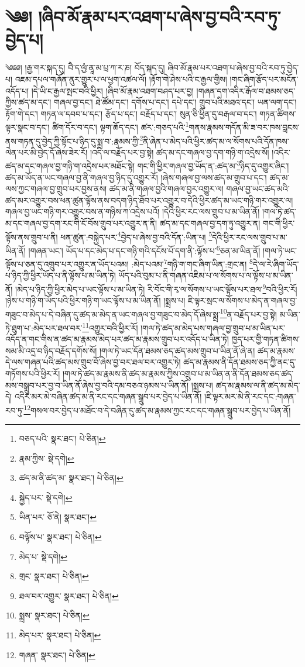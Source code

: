 \setcounter{footnote}{0} 
\chapter{༄༅། །ཞིབ་མོ་རྣམ་པར་འཐག་པ་ཞེས་བྱ་བའི་རབ་ཏུ་བྱེད་པ།}༄༅༅། །རྒྱ་གར་སྐད་དུ། བཻ་ད་ལྱཾ་ནཱ་མ་པྲ་ཀ་ར་ཎ། བོད་སྐད་དུ། ཞིབ་མོ་རྣམ་པར་འཐག་པ་ཞེས་བྱ་བའི་རབ་ཏུ་བྱེད་པ། འཇམ་དཔལ་གཞོན་ནུར་གྱུར་པ་ལ་ཕྱག་འཚལ་ལོ། །རྟོག་གེ་ཤེས་པའི་ང་རྒྱལ་གྱིས། །གང་ཞིག་རྩོད་པར་མངོན་འདོད་པ། །དེ་ཡི་ང་རྒྱལ་སྤང་བའི་ཕྱིར། །ཞིབ་མོ་རྣམ་འཐག་བཤད་པར་བྱ། །གཞན་དག་འདིར་རྒོལ་བ་ཐམས་ཅད་ཀྱིས་ཚད་མ་དང་། གཞལ་བྱ་དང་། ཐེ་ཚོམ་དང་། དགོས་པ་དང་། དཔེ་དང་། གྲུབ་པའི་མཐའ་དང་། ཡན་ལག་དང་། རྟོག་གེ་དང་། གཏན་ལ་དབབ་པ་དང་། རྩོད་པ་དང་། བརྗོད་པ་དང་། སུན་ཅི་ཕྱིན་དུ་བརྒལ་བ་དང་། གཏན་ཚིགས་ལྟར་སྣང་བ་དང་། ཚིག་དོར་བ་དང་། ལྟག་ཆོད་དང་། ཚར་:གཅད་པའི་\footnote{བཅད་པའི་  སྣར་ཐང་།  པེ་ཅིན། }གནས་རྣམས་གདོན་མི་ཟ་བར་ཁས་བླངས་ནས་གཏན་དུ་བྱེད་ཀྱི་སྟོང་པ་ཉིད་དུ་སྨྲ་བ་:རྣམས་ཀྱི་\footnote{རྣམ་ཀྱིས་  སྡེ་དགེ། }ནི་ཞེན་པ་མེད་པའི་ཕྱིར་ཚད་མ་ལ་སོགས་པའི་དོན་ཁས་ལེན་པར་མི་བྱེད་དོ་ཞེས་ཟེར་རོ། །འདི་ལ་བརྗོད་པར་བྱ་སྟེ། ཚད་མ་དང་གཞལ་བྱ་དག་གཉི་ག་འདྲེས་སོ། །འདིར་ཚད་མ་དང་གཞལ་བྱ་གཉི་ག་འདྲེས་པར་མཐོང་སྟེ། གང་གི་ཕྱིར་གཞལ་བྱ་ཡོད་ན་:ཚད་མ་\footnote{ཚད་མ་ནི་ཚད་མ་  སྣར་ཐང་།  པེ་ཅིན། }ཉིད་དུ་འགྱུར་ཞིང་། ཚད་མ་ཡོད་ན་ཡང་གཞལ་བྱ་ནི་གཞལ་བྱ་ཉིད་དུ་འགྱུར་རོ། །ཞེས་གཞལ་བྱ་ལས་ཚད་མ་གྲུབ་པ་དང་། ཚད་མ་ལས་ཀྱང་གཞལ་བྱ་གྲུབ་པར་བྱས་ནས། ཚད་མ་ནི་གཞལ་བྱའི་གཞལ་བྱར་འགྱུར་ལ། གཞལ་བྱ་ཡང་ཚད་མའི་ཚད་མར་འགྱུར་བས་ཕན་ཚུན་ལྟོས་ནས་བདག་ཉིད་ཐོབ་པར་འགྱུར་བ་དེའི་ཕྱིར་ཚད་མ་ཡང་གཉི་གར་འགྱུར་ལ། གཞལ་བྱ་ཡང་གཉི་གར་འགྱུར་བས་ན་གཉིས་ཀ་འདྲེས་པའོ། །དེའི་ཕྱིར་རང་ལས་གྲུབ་པ་མ་ཡིན་ནོ། །གལ་ཏེ་ཚད་མ་དང་གཞལ་བྱ་དག་རང་གི་ངོ་བོས་གྲུབ་པར་འགྱུར་ན་ནི། ཚད་མ་དང་གཞལ་བྱ་དག་ཏུ་འགྱུར་ན། གང་གི་ཕྱིར་ལྟོས་ནས་གྲུབ་པ་ནི། ཕན་ཚུན་:བསྐྱེད་པར་\footnote{སྐྱེད་པར་  སྡེ་དགེ། }བྱེད་པ་ཞེས་བྱ་བའི་དོན་:ཡིན་པ། \footnote{ཡིན་པར་  ཅོ་ནེ།  སྣར་ཐང་། }དེའི་ཕྱིར་རང་ལས་གྲུབ་པ་མ་ཡིན་ནོ། །གཞན་ཡང་། ཡོད་པ་དང་མེད་པ་དང་གཉི་གའི་དངོས་པོ་དག་ནི་:ལྟོས་པ་\footnote{བལྟོས་པ་  སྣར་ཐང་།  པེ་ཅིན། }ཅན་མ་ཡིན་ནོ། །གལ་ཏེ་ཡང་ལྟོས་པ་ཅན་དུ་འགྲུབ་པར་འགྱུར་ན་ཡོད་པའམ། :མེད་པའམ་\footnote{མེད་པ་  སྡེ་དགེ། }གཉི་ག་གང་ཞིག་ཡིན་:གྲང་ན། \footnote{གྲང་  སྣར་ཐང་།  པེ་ཅིན། }དེ་ལ་རེ་ཞིག་ཡོད་པ་ཉིད་ཀྱི་ཕྱིར་ཡོད་པ་ནི་ལྟོས་པ་མ་ཡིན་ཏེ། ཡོད་པའི་བུམ་པ་ནི་གཞན་འཇིམ་པ་ལ་སོགས་པ་ལ་ལྟོས་པ་མ་ཡིན་ནོ། །མེད་པ་ཉིད་ཀྱི་ཕྱིར་མེད་པ་ཡང་ལྟོས་པ་མ་ཡིན་ཏེ། རི་བོང་གི་རྭ་ལ་སོགས་པ་ཡང་ལྟོས་པར་ཐལ་\footnote{ཐལ་བར་འགྱུར་  སྣར་ཐང་།  པེ་ཅིན། }བའི་ཕྱིར་རོ། །ཉེས་པ་གཉི་ག་ཡོད་པའི་ཕྱིར་གཉི་ག་ཡང་ལྟོས་པ་མ་ཡིན་ནོ། །སྨྲས་པ། ཇི་ལྟར་སྲང་ལ་སོགས་པ་མེད་ན་གཞལ་བྱ་གཟུང་བ་མེད་པ་དེ་བཞིན་དུ་ཚད་མ་མེད་ན་ཡང་གཞལ་བྱ་གཟུང་བ་མེད་དོ་ཞེས་སྨྲ་\footnote{སྨྲས་  སྣར་ཐང་།  པེ་ཅིན། }ན་བརྗོད་པར་བྱ་སྟེ། མ་ཡིན་ཏེ་ཐུག་པ་:མེད་པར་ཐལ་བར་\footnote{མེད་པར་  སྣར་ཐང་།  པེ་ཅིན། }འགྱུར་བའི་ཕྱིར་རོ། །གལ་ཏེ་ཚད་མ་མེད་པས་གཞལ་བྱ་གྲུབ་པ་མ་ཡིན་པར་འདོད་ན་གང་གིས་ན་ཚད་མ་རྣམས་མེད་པར་ཚད་མ་རྣམས་གྲུབ་པར་འདོད་པ་ཡིན་ཏེ། ཁྱད་པར་གྱི་གཏན་ཚིགས་སམ་མི་འདྲ་བ་ཉིད་བརྗོད་དགོས་སོ། །གལ་ཏེ་ཡང་དོན་ཐམས་ཅད་ཚད་མས་གྲུབ་པ་ཡིན་ནོ་ཞེ་ན། ཚད་མ་རྣམས་དེ་ལས་གཞན་པའི་ཚད་མས་གྲུབ་བོ་ཞེས་བྱ་བར་ཐལ་བར་འགྱུར་ཏེ། ཚད་མ་རྣམས་ནི་དོན་ཐམས་ཅད་ཀྱི་ནང་དུ་གཏོགས་པའི་ཕྱིར་རོ། །གལ་ཏེ་ཚད་མ་རྣམས་ནི་ཚད་མ་རྣམས་ཀྱིས་འགྲུབ་པ་མ་ཡིན་ན་ནི་དོན་ཐམས་ཅད་ཚད་མས་བསྒྲུབ་པར་བྱ་བ་ཡིན་ནོ་ཞེས་བྱ་བའི་དམ་བཅའ་ཉམས་པ་ཡིན་ནོ། །སྨྲས་པ། ཚད་མ་རྣམས་ལ་ནི་ཚད་མ་མེད་དེ། འདིར་མར་མེ་བཞིན་ཚད་མ་ནི་རང་དང་གཞན་སྒྲུབ་པར་བྱེད་པ་ཡིན་ནོ། །ཇི་ལྟར་མར་མེ་ནི་རང་དང་:གཞན་རབ་ཏུ་\footnote{གཞན་  སྣར་ཐང་།  པེ་ཅིན། }གསལ་བར་བྱེད་པ་མཐོང་བ་དེ་བཞིན་དུ་ཚད་མ་རྣམས་ཀྱང་རང་དང་གཞན་སྒྲུབ་པར་བྱེད་པ་ཡིན་ནོ། 